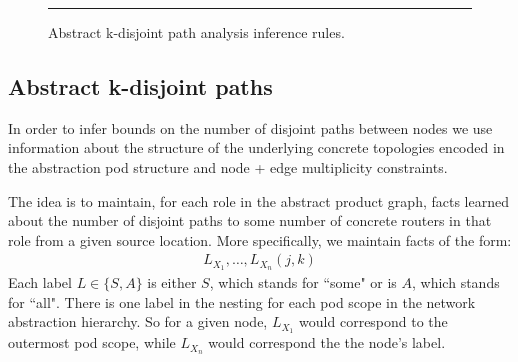\documentclass{sig-alternate-10pt}
\begin{document}
\begin{figure}[t!]
  \begin{minipage}[t]{.5\linewidth}%
  \end{minipage}

  \vspace*{3em}
  \begin{minipage}[t]{.5\linewidth}%
  \end{minipage}

  \vspace*{1em}
  \hrule
  \vspace*{1em}
  \caption{Abstract k-disjoint path analysis inference rules.}
  \label{fig:abstract-analysis}
\end{figure}


\subsection{Abstract k-disjoint paths}
\label{sec:property-checking}

In order to infer bounds on the number of disjoint paths between nodes we use information about the structure of the underlying concrete topologies encoded in the abstraction pod structure and node + edge multiplicity constraints.

The idea is to maintain, for each role in the abstract product graph, facts learned about the number of disjoint paths to some number of concrete routers in that role from a given source location. More specifically, we maintain facts of the form:
%
\[ \begin{array}{c}
  L_{X_1}, \ldots, L_{X_n}(j,k) 
\end{array} \]
\noindent
%
Each label $L \in \{S,A\}$ is either $S$, which stands for ``some" or is $A$, which stands for ``all". There is one label in the nesting for each pod scope in the network abstraction hierarchy. So for a given node, $L_{X_1}$ would correspond to the outermost pod scope, while $L_{X_n}$ would correspond the the node's label.
\end{document}
